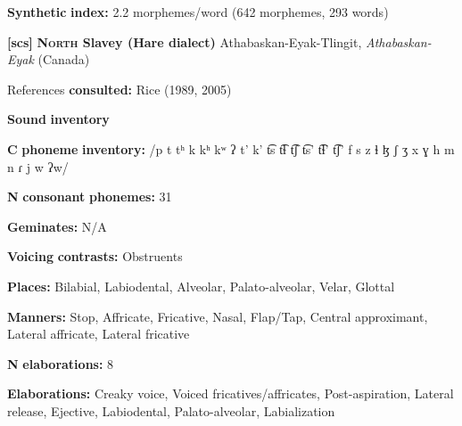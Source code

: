 \begin{styleBody}
\textbf{Synthetic} \textbf{index:} 2.2 morphemes/word (642 morphemes, 293 words)
\end{styleBody}

\begin{styleBody}
\textbf{[scs]}   \textbf{\textsc{North} \textbf{Slavey} \textbf{(Hare} \textbf{dialect)}}  Athabaskan-Eyak-Tlingit, \textit{Athabaskan-Eyak} (Canada)
\end{styleBody}

\begin{styleBody}
References \textbf{consulted:} Rice (1989, 2005)
\end{styleBody}

\begin{styleBody}
\textbf{Sound} \textbf{inventory}
\end{styleBody}

\begin{styleBody}
\textbf{C} \textbf{phoneme} \textbf{inventory:} /p t tʰ k kʰ kʷ ʔ t’ k’ t͡s t͡ɬ t͡ʃ t͡s’ t͡ɬ’ t͡ʃ’ f s z ɬ ɮ ʃ ʒ x ɣ h m n ɾ j w ʔw/
\end{styleBody}

\begin{styleBody}
\textbf{N} \textbf{consonant} \textbf{phonemes:} 31
\end{styleBody}

\begin{styleBody}
\textbf{Geminates:} N/A
\end{styleBody}

\begin{styleBody}
\textbf{Voicing} \textbf{contrasts:} Obstruents
\end{styleBody}

\begin{styleBody}
\textbf{Places:} Bilabial, Labiodental, Alveolar, Palato-alveolar, Velar, Glottal
\end{styleBody}

\begin{styleBody}
\textbf{Manners:} Stop, Affricate, Fricative, Nasal, Flap/Tap, Central approximant, Lateral affricate, Lateral fricative
\end{styleBody}

\begin{styleBody}
\textbf{N} \textbf{elaborations:} 8
\end{styleBody}

\begin{styleBody}
\textbf{Elaborations:} Creaky voice, Voiced fricatives/affricates, Post-aspiration, Lateral release, Ejective, Labiodental, Palato-alveolar, Labialization
\end{styleBody}

